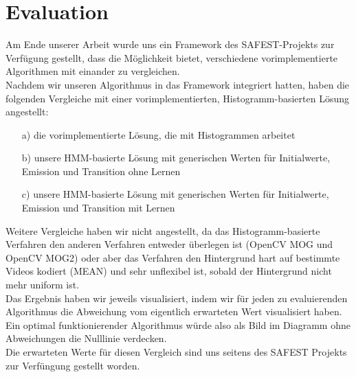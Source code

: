 \section{Evaluation}
\label{chap:evaluation}
Am Ende unserer Arbeit wurde uns ein Framework des SAFEST-Projekts zur Verfügung gestellt, dass die Möglichkeit bietet, verschiedene vorimplementierte Algorithmen mit einander zu vergleichen.\\
Nachdem wir unseren Algorithmus in das Framework integriert hatten, haben die folgenden Vergleiche mit einer vorimplementierten, Histogramm-basierten Lösung angestellt:
\begin{itemize}
	\item[a)] die vorimplementierte Lösung, die mit Histogrammen arbeitet
	\item[b)] unsere HMM-basierte Lösung mit generischen Werten für Initialwerte, Emission und Transition ohne Lernen
	\item[c)] unsere HMM-basierte Lösung mit generischen Werten für Initialwerte, Emission und Transition mit Lernen
\end{itemize}
Weitere Vergleiche haben wir nicht angestellt, da das Histogramm-basierte Verfahren den anderen Verfahren entweder überlegen ist (OpenCV MOG und OpenCV MOG2) oder aber das Verfahren den Hintergrund hart auf bestimmte Videos kodiert (MEAN) und sehr unflexibel ist, sobald der Hintergrund nicht mehr uniform ist.\\
Das Ergebnis haben wir jeweils visualisiert, indem wir für jeden zu evaluierenden Algorithmus die Abweichung vom eigentlich erwarteten Wert visualisiert haben.
Ein optimal funktionierender Algorithmus würde also als Bild im Diagramm ohne Abweichungen die Nulllinie verdecken.\\
Die erwarteten Werte für diesen Vergleich sind uns seitens des SAFEST Projekts zur Verfüngung gestellt worden.
